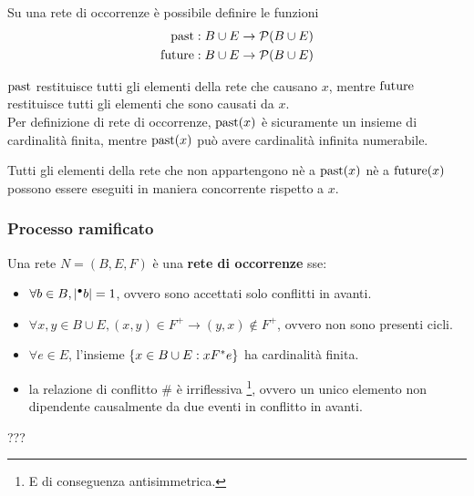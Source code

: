Su una rete di occorrenze è possibile definire le funzioni
\begin{align*}
    \textnormal{past}: B \cup E &\rightarrow \mathcal{P}(B \cup E)\\
    \textnormal{future}: B \cup E &\rightarrow \mathcal{P}(B \cup E)
\end{align*}

$\textnormal{past}$ restituisce tutti gli elementi della rete che causano $x$, mentre $\textnormal{future}$ restituisce tutti gli elementi che sono causati da $x$.\\
Per definizione di rete di occorrenze, $\textnormal{past}(x)$ è sicuramente un insieme di cardinalità finita, mentre $\textnormal{past}(x)$ può avere cardinalità infinita numerabile.

\begin{rem}
    Tutti gli elementi della rete che non appartengono nè a $\textnormal{past}(x)$ nè a $\textnormal{future}(x)$ possono essere eseguiti in maniera concorrente rispetto a $x$.
\end{rem}

\subsubsection{Processo ramificato}
\begin{defn}
    Una rete $N = (B, E, F)$ è una \textbf{rete di occorrenze} sse:
    \begin{itemize}
        \item $\forall b \in B, |{^\bullet}b| = 1$, ovvero sono accettati solo conflitti in avanti.
        \item $\forall x, y \in B \cup E, (x,y) \in F^+ \rightarrow (y,x) \notin F^+$, ovvero non sono presenti cicli.
        \item $\forall e \in E$, l'insieme $\left\{x \in B \cup E : x F^*e\right\}$ ha cardinalità finita.
        \item la relazione di conflitto $\#$ è irriflessiva \footnote{E di conseguenza antisimmetrica.}, ovvero un unico elemento non dipendente causalmente da due eventi in conflitto in avanti.
    \end{itemize}
\end{defn}
???


